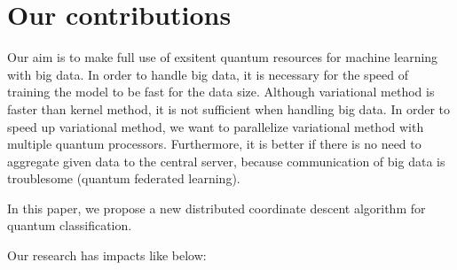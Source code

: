 \section{Our contributions}
\par Our aim is to make full use of exsitent quantum resources for machine learning with big data. In order to handle big data, it is necessary for the speed of training the model to be fast for the data size. Although  variational method is faster than kernel method, it is not sufficient when handling big data. In order to speed up variational method, we want to parallelize variational method with multiple quantum processors.
Furthermore, it is better if there is no need to aggregate given data to the central server, because communication of big data is troublesome (quantum federated learning).
  
\par In this paper, we propose a new distributed coordinate descent algorithm for quantum classification. 

\par Our research has impacts like below:

